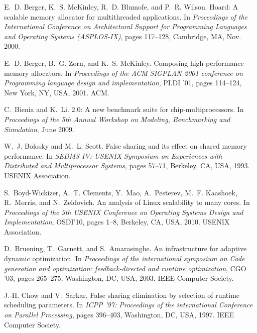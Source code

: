 \documentclass[10pt]{sigplanconf}
\begin{document}
\begin{thebibliography}{10}

E.~D. Berger, K.~S. McKinley, R.~D. Blumofe, and P.~R. Wilson.
\newblock Hoard: A scalable memory allocator for multithreaded applications.
\newblock In {\em Proceedings of the International Conference on Architectural
  Support for Programming Languages and Operating Systems (ASPLOS-IX)}, pages
  117--128, Cambridge, MA, Nov. 2000.

E.~D. Berger, B.~G. Zorn, and K.~S. McKinley.
\newblock Composing high-performance memory allocators.
\newblock In {\em Proceedings of the ACM SIGPLAN 2001 conference on Programming
  language design and implementation}, PLDI '01, pages 114--124, New York, NY,
  USA, 2001. ACM.

C.~Bienia and K.~Li.
 2.0: A new benchmark suite for chip-multiprocessors.
\newblock In {\em Proceedings of the 5th Annual Workshop on Modeling,
  Benchmarking and Simulation}, June 2009.

W.~J. Bolosky and M.~L. Scott.
\newblock False sharing and its effect on shared memory performance.
\newblock In {\em {SEDMS IV}: USENIX Symposium on Experiences with Distributed
  and Multiprocessor Systems}, pages 57--71, Berkeley, CA, USA, 1993. USENIX
  Association.

S.~Boyd-Wickizer, A.~T. Clements, Y.~Mao, A.~Pesterev, M.~F. Kaashoek,
  R.~Morris, and N.~Zeldovich.
\newblock An analysis of {Linux} scalability to many cores.
\newblock In {\em {Proceedings of the 9th USENIX Conference on Operating
  Systems Design and Implementation}}, OSDI'10, pages 1--8, Berkeley, CA, USA,
  2010. USENIX Association.

D.~Bruening, T.~Garnett, and S.~Amarasinghe.
\newblock An infrastructure for adaptive dynamic optimization.
\newblock In {\em Proceedings of the international symposium on Code generation
  and optimization: feedback-directed and runtime optimization}, CGO '03, pages
  265--275, Washington, DC, USA, 2003. IEEE Computer Society.

J.-H. Chow and V.~Sarkar.
\newblock False sharing elimination by selection of runtime scheduling
  parameters.
\newblock In {\em ICPP '97: Proceedings of the international Conference on
  Parallel Processing}, pages 396--403, Washington, DC, USA, 1997. IEEE
  Computer Society.


\end{thebibliography}
\end{document}
